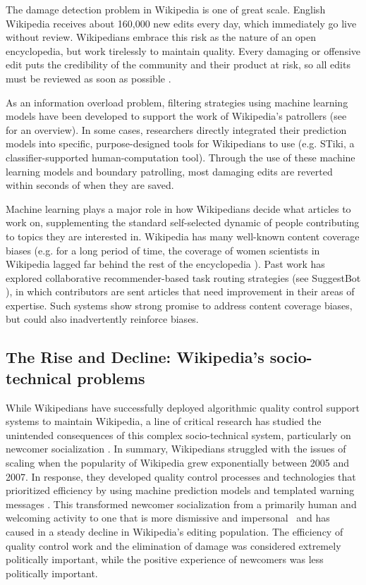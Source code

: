  The damage detection problem in Wikipedia is one of great scale.  English Wikipedia receives about 160,000 new edits every day, which immediately go live without review.  Wikipedians embrace this risk as the nature of an open encyclopedia, but work tirelessly to maintain quality. Every damaging or offensive edit puts the credibility of the community and their product at risk, so all edits must be reviewed as soon as possible \cite{geiger2010work}.

As an information overload problem, filtering strategies using machine learning models have been developed to support the work of Wikipedia's patrollers (see \cite{adler2011wikipedia} for an overview).  In some cases, researchers directly integrated their prediction models into specific, purpose-designed tools for Wikipedians to use (e.g. STiki\cite{west2010stiki}, a classifier-supported human-computation tool). Through the use of these machine learning models and boundary patrolling, most damaging edits are reverted within seconds of when they are saved\cite{geiger2013levee}.

Machine learning plays a major role in how Wikipedians decide what articles to work on, supplementing the standard self-selected dynamic of people contributing to topics they are interested in. Wikipedia has many well-known content coverage biases (e.g. for a long period of time, the coverage of women scientists in Wikipedia lagged far behind the rest of the encyclopedia \cite{halfaker2017interpolating}). Past work has explored collaborative recommender-based task routing strategies (see SuggestBot \cite{cosley2007suggestbot}), in which contributors are sent articles that need improvement in their areas of expertise. Such systems show strong promise to address content coverage biases, but could also inadvertently reinforce biases.

\subsection{The Rise and Decline: Wikipedia's socio-technical problems}
While Wikipedians have successfully deployed algorithmic quality control support systems to maintain Wikipedia, a line of critical research has studied the unintended consequences of this complex socio-technical system, particularly on newcomer socialization  \cite{halfaker2013rise,morgan2013tea,halfaker2014snuggle}.  In summary, Wikipedians struggled with the issues of scaling when the popularity of Wikipedia grew exponentially between 2005 and 2007\cite{halfaker2013rise}.  In response, they developed quality control processes and technologies that prioritized efficiency by using machine prediction models \cite{halfaker2014snuggle} and templated warning messages \cite{halfaker2013rise}.  This transformed newcomer socialization from a primarily human and welcoming activity to one that is more dismissive and impersonal~\cite{morgan2013tea} and has caused in a steady decline in Wikipedia's editing population.  The efficiency of quality control work and the elimination of damage was considered extremely politically important, while the positive experience of newcomers was less politically important.


